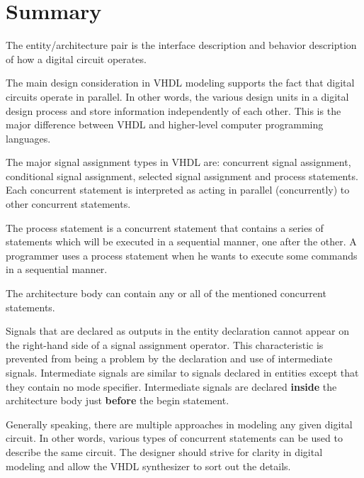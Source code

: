 \section{Summary}
\begin{my_list}
\item The entity/architecture pair is the interface description and behavior description of how a digital circuit operates.
\item The main design consideration in VHDL modeling supports the fact that digital circuits operate in parallel. In other words, the various design units in a digital design process and store information independently of each other. This is the major difference between VHDL and higher-level computer programming languages.
\item The major signal assignment types in VHDL are: concurrent signal assignment, conditional signal assignment, selected signal assignment and process statements. Each concurrent statement is interpreted as acting in parallel (concurrently) to other concurrent statements.
\item The process statement is a concurrent statement that contains a series of statements which will be executed in a sequential manner, one after the other. A programmer uses a process statement when he wants to execute some commands in a sequential manner.
\item The architecture body can contain any or all of the mentioned concurrent statements.
\item Signals that are declared as outputs in the entity declaration cannot appear on the right-hand side of a signal assignment operator. This characteristic is prevented from being a problem by the declaration and use of intermediate signals. Intermediate signals are similar to signals declared in entities except that they contain no mode specifier. Intermediate signals are declared \textbf{inside} the architecture body just \textbf{before} the begin statement.
\item Generally speaking, there are multiple approaches in modeling any given digital circuit. In other words, various types of concurrent statements can be used to describe the same circuit. The designer should strive for clarity in digital modeling and allow the VHDL synthesizer to sort out the details.
\end{my_list}

